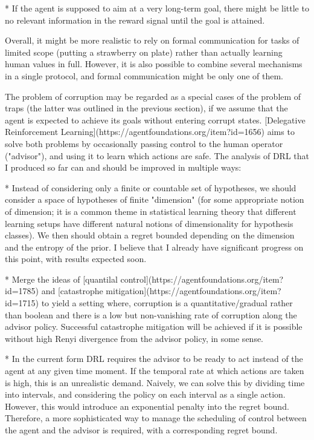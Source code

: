 \documentclass[a4paper]{article}
\begin{document}
* If the agent is supposed to aim at a very long-term goal, there might be little to no relevant information in the reward signal until the goal is attained.

Overall, it might be more realistic to rely on formal communication for tasks of limited scope (putting a strawberry on plate) rather than actually learning human values in full. However, it is also possible to combine several mechanisms in a single protocol, and formal communication might be only one of them.

The problem of corruption may be regarded as a special cases of the problem of traps (the latter was outlined in the previous section), if we assume that the agent is expected to achieve its goals without entering corrupt states. [Delegative Reinforcement Learning](https://agentfoundations.org/item?id=1656) aims to solve both problems by occasionally passing control to the human operator ("advisor"), and using it to learn which actions are safe. The analysis of DRL that I produced so far can and should be improved in multiple ways:

* Instead of considering only a finite or countable set of hypotheses, we should consider a space of hypotheses of finite "dimension" (for some appropriate notion of dimension; it is a common theme in statistical learning theory that different learning setups have different natural notions of dimensionality for hypothesis classes). We then should obtain a regret bounded depending on the dimension and the entropy of the prior. I believe that I already have significant progress on this point, with results expected soon.

* Merge the ideas of [quantilal control](https://agentfoundations.org/item?id=1785) and [catastrophe mitigation](https://agentfoundations.org/item?id=1715) to yield a setting where, corruption is a quantitative/gradual rather than boolean and there is a low but non-vanishing rate of corruption along the advisor policy. Successful catastrophe mitigation will be achieved if it is possible without high Renyi divergence from the advisor policy, in some sense.

* In the current form DRL requires the advisor to be ready to act instead of the agent at any given time moment. If the temporal rate at which actions are taken is high, this is an unrealistic demand. Naively, we can solve this by dividing time into intervals, and considering the policy on each interval as a single action. However, this would introduce an exponential penalty into the regret bound. Therefore, a more sophisticated way to manage the scheduling of control between the agent and the advisor is required, with a corresponding regret bound.
\end{document}
